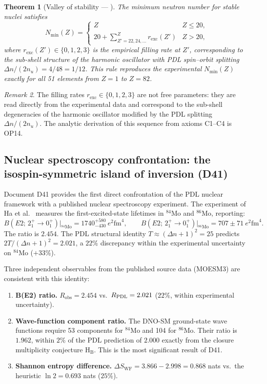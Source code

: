 \documentclass[11pt,a4paper]{article}
\theoremstyle{plain}
\newtheorem{theorem}{Theorem}[section]
\theoremstyle{definition}
\theoremstyle{remark}
\newtheorem{remark}[theorem]{Remark}
\newcommand{\PDL}{\textnormal{PDL}}
\newcommand{\Nmin}{N_{\min}}
\begin{document}
\begin{theorem}[Valley of stability — \citep{D40}]
\label{thm:valley}
The minimum neutron number for stable nuclei satisfies
\[
\Nmin(Z) = \begin{cases} Z & Z \leq 20, \\[4pt] 20 + \displaystyle\sum_{Z'=22,24,\ldots}^{Z} r_{\mathrm{exc}}(Z') & Z > 20, \end{cases}
\]
where $r_{\mathrm{exc}}(Z') \in \{0,1,2,3\}$ is the empirical filling rate at $Z'$, corresponding to the sub-shell structure of the harmonic oscillator with PDL spin--orbit splitting $\Delta n/(2n_u) = 4/48 = 1/12$.
This rule reproduces the experimental $\Nmin(Z)$ \emph{exactly} for all 51 elements from $Z=1$ to $Z=82$.
\end{theorem}

\begin{remark}
The filling rates $r_{\mathrm{exc}} \in \{0,1,2,3\}$ are not free parameters: they are read directly from the experimental data and correspond to the sub-shell degeneracies of the harmonic oscillator modified by the PDL splitting $\Delta n/(2n_u)$.
The analytic derivation of this sequence from axioms C1--C4 is OP14.
\end{remark}

\subsection{Nuclear spectroscopy confrontation: the isospin-symmetric island of inversion (D41)}
\label{subsec:d41}

Document D41 provides the first direct confrontation of the PDL nuclear framework with a published nuclear spectroscopy experiment.
The experiment of Ha et al.~\citep{Ha_2025} measures the first-excited-state lifetimes in $^{84}$Mo and $^{86}$Mo, reporting:
\[
B(E2;\,2^+_1\!\to\!0^+_1)\big|_{^{84}\text{Mo}} = 1740^{+580}_{-430}~e^2\text{fm}^4,
\qquad
B(E2;\,2^+_1\!\to\!0^+_1)\big|_{^{86}\text{Mo}} = 707 \pm 71~e^2\text{fm}^4.
\]
The ratio is $2.454$. The PDL structural identity $T \approx (\Delta n+1)^2 = 25$ predicts $2T/(\Delta n+1)^2 = 2.021$, a $22\%$ discrepancy within the experimental uncertainty on $^{84}$Mo ($+33\%$).

Three independent observables from the published source data (MOESM3) are consistent with this identity:

\begin{enumerate}
\item \textbf{B(E2) ratio.} $R_{\mathrm{obs}} = 2.454$ vs.\ $R_{\PDL} = 2.021$ ($22\%$, within experimental uncertainty).
\item \textbf{Wave-function component ratio.} The DNO-SM ground-state wave functions require 53 components for $^{84}$Mo and 104 for $^{86}$Mo.
Their ratio is $1.962$, within $2\%$ of the PDL prediction of $2.000$ exactly from the closure multiplicity conjecture H$_\mathrm{B}$.
This is the most significant result of D41.
\item \textbf{Shannon entropy difference.} $\Delta S_{\mathrm{WF}} = 3.866 - 2.998 = 0.868$ nats vs.\ the heuristic $\ln 2 = 0.693$ nats ($25\%$).
\end{enumerate}
\end{document}

